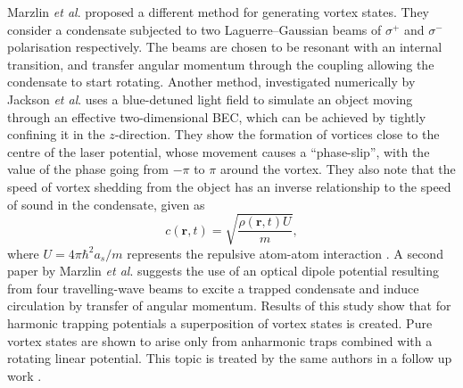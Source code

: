 Marzlin \textit{et al}. \cite{Vtx:Marzlin_prl_1997} proposed a different method for generating vortex states. They consider a condensate subjected to two Laguerre--Gaussian beams of $\sigma^+$ and $\sigma^-$ polarisation respectively. The beams are chosen to be resonant with an internal transition, and transfer angular momentum through the coupling allowing the condensate to start rotating. Another method, investigated numerically by Jackson \textit{et al}. \cite{Vtx:Jackson_prl_1998} uses a blue-detuned light field to simulate an object moving through an effective two-dimensional BEC, which can be achieved by tightly confining it in the $z$-direction. They show the formation of vortices close to the centre of the laser potential, whose movement causes a ``phase-slip'', with the value of the phase going from $-\pi$ to $\pi$ around the vortex. They also note that the speed of vortex shedding from the object has an inverse relationship to the speed of sound in the condensate, given as
\begin{equation}
c(\textbf{r},t) = \sqrt{\frac{\rho (\textbf{r},t) U}{m}},
\end{equation}
where $U=4\pi\hbar^2 a_s/m$ represents the repulsive atom-atom interaction \cite{BEC:Andrews_prl_1997}. A second paper by Marzlin \textit{et al}. \cite{Vtx:Zhang_pra_1998} suggests the use of an optical dipole potential resulting from four travelling-wave beams to excite a trapped condensate and induce circulation by transfer of angular momentum. Results of this study show that for harmonic trapping potentials a superposition of vortex states is created. Pure vortex states are shown to arise only from anharmonic traps combined with a rotating linear potential. This topic is treated by the same authors in a follow up work \cite{Vtx:Marzlin_pra_1998}.

